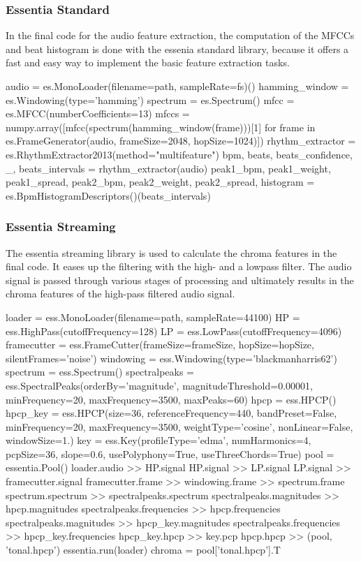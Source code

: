 \subsubsection{Essentia Standard}

In the final code for the audio feature extraction, the computation of the MFCCs and beat histogram is done with the essenia standard library, because it offers a fast and easy way to implement the basic feature extraction tasks. 
\begin{pythonCode}[frame=single,label={lst:esss},caption={essentia standard},captionpos=b]
audio = es.MonoLoader(filename=path, sampleRate=fs)()
hamming_window = es.Windowing(type='hamming')
spectrum = es.Spectrum()
mfcc = es.MFCC(numberCoefficients=13)
mfccs = numpy.array([mfcc(spectrum(hamming_window(frame)))[1] 
	for frame in es.FrameGenerator(audio, frameSize=2048, hopSize=1024)])
rhythm_extractor = es.RhythmExtractor2013(method="multifeature")
bpm, beats, beats_confidence, _, beats_intervals = rhythm_extractor(audio)
peak1_bpm, peak1_weight, peak1_spread, peak2_bpm, peak2_weight, peak2_spread, histogram =
	es.BpmHistogramDescriptors()(beats_intervals)
\end{pythonCode}

\subsubsection{Essentia Streaming}

The essentia streaming library is used to calculate the chroma features in the final code. It eases up the filtering with the high- and a lowpass filter. The audio signal is passed through various stages of processing and ultimately results in the chroma features of the high-pass filtered audio signal. 
\begin{pythonCode}[frame=single,label={lst:essst},caption={essentia streaming},captionpos=b]
loader = ess.MonoLoader(filename=path, sampleRate=44100)
HP = ess.HighPass(cutoffFrequency=128)
LP = ess.LowPass(cutoffFrequency=4096)
framecutter = ess.FrameCutter(frameSize=frameSize, hopSize=hopSize, 
	silentFrames='noise')
windowing = ess.Windowing(type='blackmanharris62')
spectrum = ess.Spectrum()
spectralpeaks = ess.SpectralPeaks(orderBy='magnitude', magnitudeThreshold=0.00001, 
	minFrequency=20, maxFrequency=3500, maxPeaks=60)
hpcp = ess.HPCP()
hpcp_key = ess.HPCP(size=36, referenceFrequency=440, bandPreset=False, minFrequency=20,
	maxFrequency=3500, weightType='cosine', nonLinear=False, windowSize=1.)
key = ess.Key(profileType='edma', numHarmonics=4, pcpSize=36, slope=0.6, 
	usePolyphony=True, useThreeChords=True)
pool = essentia.Pool()
loader.audio >> HP.signal
HP.signal >> LP.signal
LP.signal >> framecutter.signal    
framecutter.frame >> windowing.frame >> spectrum.frame
spectrum.spectrum >> spectralpeaks.spectrum
spectralpeaks.magnitudes >> hpcp.magnitudes
spectralpeaks.frequencies >> hpcp.frequencies
spectralpeaks.magnitudes >> hpcp_key.magnitudes
spectralpeaks.frequencies >> hpcp_key.frequencies
hpcp_key.hpcp >> key.pcp
hpcp.hpcp >> (pool, 'tonal.hpcp')
essentia.run(loader)
chroma = pool['tonal.hpcp'].T
\end{pythonCode}	

